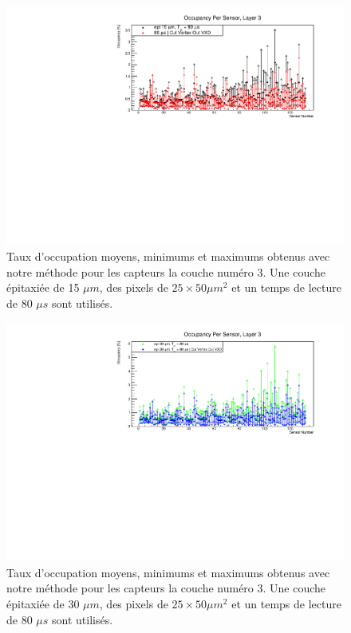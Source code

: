 \begin{appendices}
  \begin{figure}[!htb]
    \begin{center}
      \includegraphics[scale=0.80]{./figures/sensors_Readout_Time/resultOccupancyPerSensor/occupancyPerSensor_Layer3_epi_15um_Min_Max.pdf}
      \caption{Taux d'occupation moyens, minimums et maximums obtenus avec notre m\'ethode pour les capteurs la couche num\'ero 3. Une couche \'epitaxi\'ee de 15 $\mu m$, des pixels de $25 \times 50 \mu m^2$ et un temps de lecture de 80 $\mu s$ sont utilis\'es.}
      \label{fig:OccupancyLayer3_epi15um_Min_Max}
    \end{center}
  \end{figure}

  \begin{figure}[!htb]
    \begin{center}
      \includegraphics[scale=0.80]{./figures/sensors_Readout_Time/resultOccupancyPerSensor/occupancyPerSensor_Layer3_epi_30um_Min_Max.pdf}
      \caption{Taux d'occupation moyens, minimums et maximums obtenus avec notre m\'ethode pour les capteurs la couche num\'ero 3. Une couche \'epitaxi\'ee de 30 $\mu m$, des pixels de $25 \times 50 \mu m^2$ et un temps de lecture de 80 $\mu s$ sont utilis\'es.}
      \label{fig:OccupancyLayer3_epi30um_Min_Max}
    \end{center}
  \end{figure}
  

\end{appendices}
